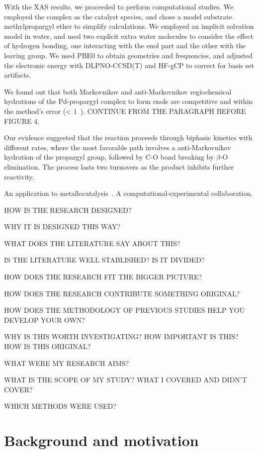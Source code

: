 With the XAS results, we proceeded to perform computational studies.
We employed the  complex as the catalyst species, and chose a
model substrate methylpropargyl ether to simplify calculations.
We employed an implicit solvation model in water, and used two explicit extra
water molecules to consider the effect of hydrogen bonding, one interacting
with the enol part and the other with the leaving group.
We used PBE0 to obtain geometries and frequencies, and adjusted the electronic
energy with DLPNO-CCSD(T) and HF-gCP to correct for basis set artifacts.

We found out that both Markovnikov and anti-Markovnikov regiochemical
hydrations of the Pd-propargyl complex to form enols are competitive and within
the method's error (< 1~\kcalmol).
CONTINUE FROM THE PARAGRAPH BEFORE FIGURE 4.

Our evidence suggested that the reaction proceeds through biphasic kinetics
with different rates, where the most favorable path involves a 
anti-Markovnikov hydration of the propargyl group, followed by C-O bond breaking
by $\beta$-O elimination.
The process lasts two turnovers as the product inhibits further
reactivity.

An application to metallocatalysis~\cite{Coelho2019}.
A computational-experimental collaboration.

HOW IS THE RESEARCH DESIGNED?\@

WHY IT IS DESIGNED THIS WAY?\@

WHAT DOES THE LITERATURE SAY ABOUT THIS?\@

IS THE LITERATURE WELL STABLISHED?\@
IS IT DIVIDED?\@

HOW DOES THE RESEARCH FIT THE BIGGER PICTURE?\@

HOW DOES THE RESEARCH CONTRIBUTE SOMETHING ORIGINAL?\@

HOW DOES THE METHODOLOGY OF PREVIOUS STUDIES HELP YOU DEVELOP YOUR OWN?\@

WHY IS THIS WORTH INVESTIGATING?\@
HOW IMPORTANT IS THIS?\@
HOW IS THIS ORIGINAL?\@

WHAT WERE MY RESEARCH AIMS?\@

WHAT IS THE SCOPE OF MY STUDY?\@
WHAT I COVERED AND DIDN'T COVER?\@

WHICH METHODS WERE USED?\@

\section{Background and motivation}

